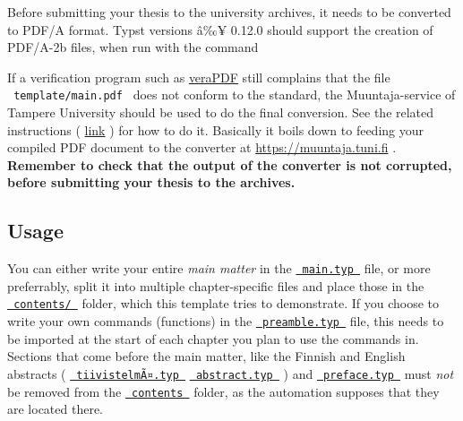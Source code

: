 Before submitting your thesis to the university archives, it needs to be
converted to PDF/A format. Typst versions â‰¥ 0.12.0 should support the
creation of PDF/A-2b files, when run with the command

\begin{Shaded}
\begin{Highlighting}[]
\end{Highlighting}
\end{Shaded}

If a verification program such as
\href{https://docs.verapdf.org/install/}{veraPDF} still complains that
the file \texttt{\ template/main.pdf\ } does not conform to the
standard, the Muuntaja-service of Tampere University should be used to
do the final conversion. See the related instructions (
\href{https://libguides.tuni.fi/opinnaytteet/pdfa}{link} ) for how to do
it. Basically it boils down to feeding your compiled PDF document to the
converter at \href{https://muuntaja.tuni.fi/}{https://muuntaja.tuni.fi}
. \textbf{Remember to check that the output of the converter is not
corrupted, before submitting your thesis to the archives.}

\subsection{Usage}\label{usage}

You can either write your entire \emph{main matter} in the
\href{https://github.com/typst/packages/raw/main/packages/preview/scholarly-tauthesis/0.9.0/template/main.typ}{\texttt{\ main.typ\ }}
file, or more preferrably, split it into multiple chapter-specific files
and place those in the
\href{https://github.com/typst/packages/raw/main/packages/preview/scholarly-tauthesis/0.9.0/template/content}{\texttt{\ contents/\ }}
folder, which this template tries to demonstrate. If you choose to write
your own commands (functions) in the
\href{https://github.com/typst/packages/raw/main/packages/preview/scholarly-tauthesis/0.9.0/template/preamble.typ}{\texttt{\ preamble.typ\ }}
file, this needs to be imported at the start of each chapter you plan to
use the commands in. Sections that come before the main matter, like the
Finnish and English abstracts (
\href{https://github.com/typst/packages/raw/main/packages/preview/scholarly-tauthesis/0.9.0/template/content/tiivistelm\%C3\%A4.typ}{\texttt{\ tiivistelmÃ¤.typ\ }}
\textbar{}
\href{https://github.com/typst/packages/raw/main/packages/preview/scholarly-tauthesis/0.9.0/template/content/abstract.typ}{\texttt{\ abstract.typ\ }}
) and
\href{https://github.com/typst/packages/raw/main/packages/preview/scholarly-tauthesis/0.9.0/template/content/preface.typ}{\texttt{\ preface.typ\ }}
must \emph{not} be removed from the
\href{https://github.com/typst/packages/raw/main/packages/preview/scholarly-tauthesis/0.9.0/template/content}{\texttt{\ contents\ }}
folder, as the automation supposes that they are located there.

